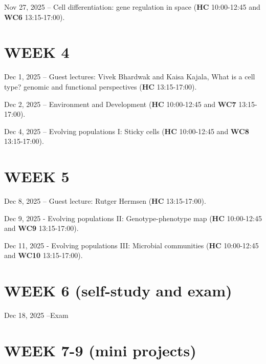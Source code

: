 \documentclass[
  letterpaper,
  DIV=11,
  numbers=noendperiod]{scrreprt}
\theoremstyle{definition}
\theoremstyle{remark}
\begin{document}
Nov 27, 2025 -- Cell differentiation: gene regulation in space
(\textbf{HC} 10:00-12:45 and \textbf{WC6} 13:15-17:00).

\section*{WEEK 4}\label{week-4}


Dec 1, 2025 -- Guest lectures: Vivek Bhardwak and Kaisa Kajala, What is
a cell type? genomic and functional perspectives (\textbf{HC}
13:15-17:00).

Dec 2, 2025 -- Environment and Development (\textbf{HC} 10:00-12:45 and
\textbf{WC7} 13:15-17:00).

Dec 4, 2025 -- Evolving populations I: Sticky cells (\textbf{HC}
10:00-12:45 and \textbf{WC8} 13:15-17:00).

\section*{WEEK 5}\label{week-5}


Dec 8, 2025 -- Guest lecture: Rutger Hermsen (\textbf{HC} 13:15-17:00).

Dec 9, 2025 - Evolving populations II: Genotype-phenotype map
(\textbf{HC} 10:00-12:45 and \textbf{WC9} 13:15-17:00).

Dec 11, 2025 - Evolving populations III: Microbial communities
(\textbf{HC} 10:00-12:45 and \textbf{WC10} 13:15-17:00).

\section*{WEEK 6 (self-study and
exam)}\label{week-6-self-study-and-exam}


Dec 18, 2025 --Exam

\section*{WEEK 7-9 (mini projects)}\label{week-7-9-mini-projects}

\end{document}
